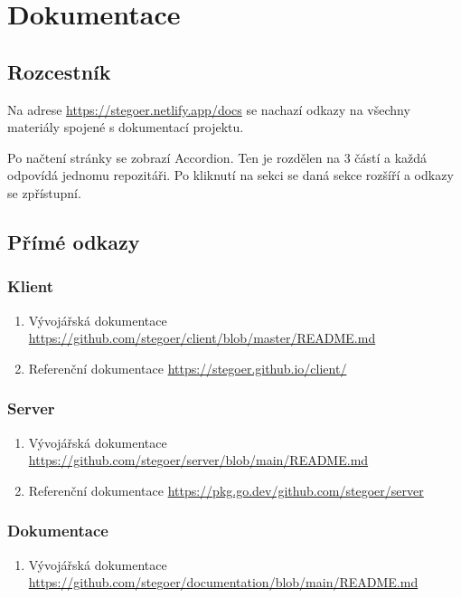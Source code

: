 
\section{Dokumentace}\label{sec:dokumentace}

\subsection{Rozcestník}\label{subsec:rozcestnik}
Na adrese \url{https://stegoer.netlify.app/docs} se nachazí odkazy na všechny
materiály spojené s dokumentací projektu.

Po načtení stránky se zobrazí Accordion\cite{enwiki:accordion}.
Ten je rozdělen na 3 částí a každá odpovídá jednomu repozitáři.
Po kliknutí na sekci se daná sekce rozšíří a odkazy se zpřístupní.

\subsection{Přímé odkazy}\label{subsec:online}

\subsubsection{Klient}\label{subsubsec:doc-klient}

\begin{enumerate}
    \item Vývojářská dokumentace \url{https://github.com/stegoer/client/blob/master/README.md}
    \item Referenční dokumentace \url{https://stegoer.github.io/client/}
\end{enumerate}

\subsubsection{Server}\label{subsubsec:doc-server}
\begin{enumerate}
    \item Vývojářská dokumentace \url{https://github.com/stegoer/server/blob/main/README.md}
    \item Referenční dokumentace \url{https://pkg.go.dev/github.com/stegoer/server}
\end{enumerate}

\subsubsection{Dokumentace}\label{subsubsec:doc-dokumentace}
\begin{enumerate}
    \item Vývojářská dokumentace \url{https://github.com/stegoer/documentation/blob/main/README.md}
\end{enumerate}

